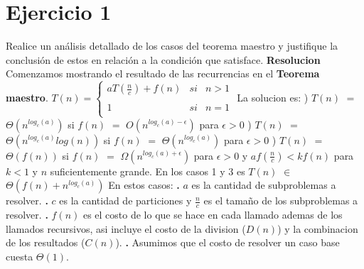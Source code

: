 \documentclass[10pt,a4paper]{article}
\begin{document}
\maketitle

\section{Ejercicio 1}

Realice un análisis detallado de los casos del teorema maestro y justifique la conclusión de estos en relación a la condición que satisface.
\newline
\newline
\textbf{Resolucion}
\newline
\newline
Comenzamos mostrando el resultado de las recurrencias en el \textbf{Teorema maestro}.
\newline
\newline
$T(n) = \left\{ \begin{array}{lcc}
	aT(\displaystyle \frac{n}{c}) + f(n) &   si  & n > 1 \\
	\\          1 &   si  & n = 1     \\
\end{array}
\right.$
\newline
\newline
\newline
La solucion es:
\newline
{}) $T(n)$ $=$ $\Theta(n^{log_{c}(a)})$ si $f(n)$ $=$ $O(n^{log_{c}(a) - \epsilon})$ para $\epsilon > 0$
\newline
{}) $T(n)$ $=$ $\Theta(n^{log_{c}(a)}log(n))$ si $f(n)$ $=$ $\Theta(n^{log_{c}(a)})$ para $\epsilon > 0$
\newline
{}) $T(n)$ $=$ $\Theta(f(n))$ si $f(n)$ $=$ $\Omega(n^{log_{c}(a) + \epsilon})$ para $\epsilon > 0$ y $af(\displaystyle \frac{n}{c}) < kf(n)$ para $k < 1$ y $n$ suficientemente grande. 
\newline
\newline
En los casos 1 y 3 es $T(n)$ $\in$ $\Theta(f(n) + n^{log_{c}(a)})$
\newline
\newline
En estos casos:
\newline
\newline
\textbf{.} $a$ es la cantidad de subproblemas a resolver.
\newline
\newline
\textbf{.} $c$ es la cantidad de particiones y $\displaystyle \frac{n}{c}$ es el tamaño de los subproblemas a resolver. 
\newline
\newline
\textbf{.} $f(n)$ es el costo de lo que se hace en cada llamado ademas de los llamados recursivos, asi incluye el costo de la division ($D(n)$) y la combinacion de los resultados ($C(n)$). 
\newline
\newline
\textbf{.} Asumimos que el costo de resolver un caso base cuesta $\Theta(1)$.


\newpage
\end{document}
